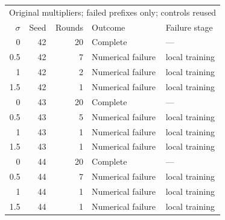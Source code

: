 \begin{tabular}{rrrll}
\toprule
\multicolumn{5}{l}{Original multipliers; failed prefixes only; controls reused} \\
$\sigma$ & Seed & Rounds & Outcome & Failure stage \\
\midrule
0 & 42 & 20 & Complete & --- \\
0.5 & 42 & 7 & Numerical failure & local training \\
1 & 42 & 2 & Numerical failure & local training \\
1.5 & 42 & 1 & Numerical failure & local training \\
0 & 43 & 20 & Complete & --- \\
0.5 & 43 & 5 & Numerical failure & local training \\
1 & 43 & 1 & Numerical failure & local training \\
1.5 & 43 & 1 & Numerical failure & local training \\
0 & 44 & 20 & Complete & --- \\
0.5 & 44 & 7 & Numerical failure & local training \\
1 & 44 & 1 & Numerical failure & local training \\
1.5 & 44 & 1 & Numerical failure & local training \\
\bottomrule
\end{tabular}
